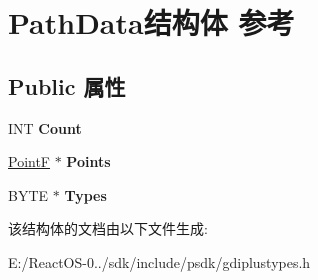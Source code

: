 \hypertarget{struct_path_data}{}\section{Path\+Data结构体 参考}
\label{struct_path_data}
\subsection*{Public 属性}
\begin{DoxyCompactItemize}
\item 
\mbox{\label{struct_path_data_a02f5bf4ed869f475a76dc85c9cb575b5}} 
I\+NT {\bfseries Count}
\item 
\mbox{\label{struct_path_data_a7e9daa0183dc85b92b998237ff47a0d6}} 
\hyperlink{struct_point_f}{PointF} $\ast$ {\bfseries Points}
\item 
\mbox{\label{struct_path_data_aedc2b02d07534f9a54ccac5975a6702d}} 
B\+Y\+TE $\ast$ {\bfseries Types}
\end{DoxyCompactItemize}


该结构体的文档由以下文件生成\+:\begin{DoxyCompactItemize}
\item 
E\+:/\+React\+O\+S-\/0../sdk/include/psdk/gdiplustypes.\+h\end{DoxyCompactItemize}
